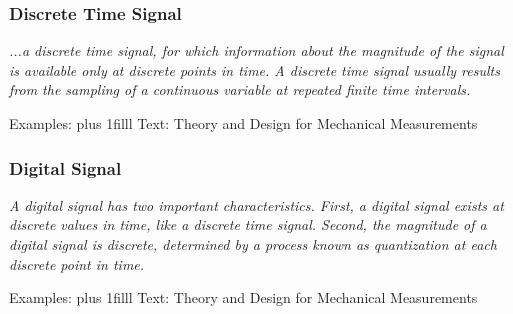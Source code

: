 \documentclass[fleqn]{beamer} %
\newcommand{\sectiontitleIV}{Discrete Time Signal}
\newcommand{\sectiontitleV}{Digital Signal}
\newcommand{\btVFill}{\vskip0pt plus 1filll}
\begin{document}
	\begin{frame} \small
		\frametitle{\sectiontitleIV}    
		\bigskip  
			
		{\it ...a {\GR discrete time} signal, for which information about the
		magnitude of the signal is available only at discrete points in time. A discrete time signal usually
		results from the sampling of a continuous variable at repeated finite time intervals. }

		\vspace{40mm}
		Examples:
		\btVFill
		\tiny{Text: Theory and Design for Mechanical Measurements}	
	\end{frame}
	
	\begin{frame} \small
		\frametitle{\sectiontitleV}    
		\bigskip 
			{\it A {\BL digital} signal has two important characteristics. First, a digital signal
			exists at discrete values in time, like a discrete time signal. Second, the magnitude of a digital signal
			is discrete, determined by a process known as quantization at each discrete point in time. }

		\vspace{40mm}
		Examples:
		\btVFill
		\tiny{Text: Theory and Design for Mechanical Measurements}	
	\end{frame}
	
\end{document}
